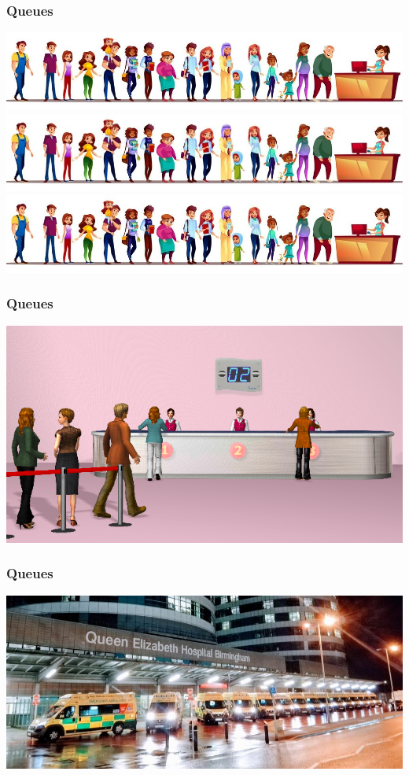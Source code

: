 \begin{frame}
    \frametitle{Queues}
    \centering

    \includegraphics[scale=0.3]{Bin/supermarket-queue.jpg}
    \pause
    \includegraphics[scale=0.3]{Bin/supermarket-queue.jpg}
    \includegraphics[scale=0.3]{Bin/supermarket-queue.jpg}
\end{frame}


\begin{frame}
    \frametitle{Queues}
    \centering

    \includegraphics[scale=0.55]{Bin/bank-queue.png}
\end{frame}


\begin{frame}
    \frametitle{Queues}
    \centering
    \includegraphics[scale=0.45]{Bin/ambulance_queue.jpg}
\end{frame}